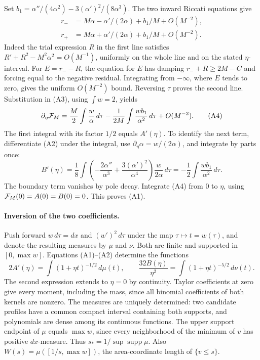 \documentclass[11pt,letterpaper]{article}
\begin{document}
Set \(b_1=\alpha''/(4\alpha^2)-3(\alpha')^2/(8\alpha^3)\). The two
inward Riccati equations give
\begin{align*}
 r_-&=M\alpha-\alpha'/(2\alpha)+b_1/M+O(M^{-2}),\\
 r_+&=M\alpha+\alpha'/(2\alpha)+b_1/M+O(M^{-2}).
\end{align*}
Indeed the trial expression \(R\) in the first line satisfies
\(R'+R^2-M^2\alpha^2=O(M^{-1})\), uniformly on the whole line and
on the stated \(\eta\)-interval. For \(E=r_--R\), the equation for
\(E\) has damping \(r_-+R\geq2M-C\) and forcing equal to the negative
residual. Integrating from \(-\infty\), where \(E\) tends to zero,
gives the uniform \(O(M^{-2})\) bound. Reversing \(\tau\) proves the
second line. Substitution in (A3), using \(\int w=2\), yields
\[
 \partial_\eta{\cal F}_M=
 \frac{M}{2}\int\frac{w}{\alpha}\,d\tau
 -\frac1{2M}\int\frac{w b_1}{\alpha^2}\,d\tau+O(M^{-2}).
 \tag{A4}
\]
The first integral with its factor \(1/2\) equals \(A'(\eta)\).
To identify the next term, differentiate (A2) under the integral,
use \(\partial_\eta\alpha=w/(2\alpha)\), and integrate by parts once:
\[
 B'(\eta)=\frac18\int
 \left(-\frac{2\alpha''}{\alpha^3}
             +\frac{3(\alpha')^2}{\alpha^4}\right)
       \frac{w}{2\alpha}\,d\tau
 =-\frac12\int\frac{w b_1}{\alpha^2}\,d\tau .
\]
The boundary term vanishes by pole decay. Integrate (A4) from \(0\)
to \(\eta\), using \({\cal F}_M(0)=A(0)=B(0)=0\). This proves (A1).

\paragraph{Inversion of the two coefficients.}
Push forward \(w\,d\tau=dx\) and \((w')^2\,d\tau\) under the map
\(\tau\mapsto t=w(\tau)\), and denote the resulting measures by
\(\mu\) and \(\nu\). Both are finite and supported in \([0,\max w]\).
Equations (A1)--(A2) determine the functions
\[
 2A'(\eta)=\int(1+\eta t)^{-1/2}\,d\mu(t),\qquad
 \frac{32B(\eta)}{\eta^2}=\int(1+\eta t)^{-5/2}\,d\nu(t).
 \tag{A5}
\]
The second expression extends to \(\eta=0\) by continuity. Taylor
coefficients at zero give every moment, including the mass, since all
binomial coefficients of both kernels are nonzero. The measures are
uniquely determined: two candidate profiles have a common compact
interval containing both supports, and polynomials are dense among its
continuous functions. The upper support endpoint of \(\mu\) equals
\(\max w\), since every neighborhood of the minimum of \(v\) has
positive \(dx\)-measure. Thus \(s_*=1/\sup\operatorname{supp}\mu\).
Also \(W(s)=\mu([1/s,\max w])\), the area-coordinate length of
\(\{v\leq s\}\).
\end{document}

